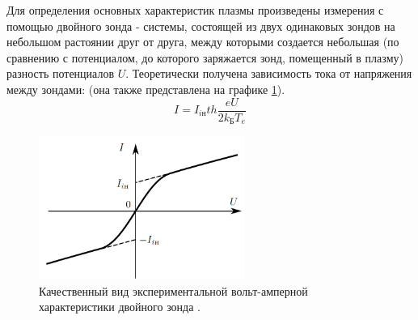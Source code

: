 \documentclass[a4paper,12pt]{article} %
\begin{document}
Для определения основных характеристик плазмы произведены измерения с помощью двойного зонда - системы, состоящей из двух одинаковых зондов на небольшом растоянии друг от друга, между которыми создается небольшая (по сравнению с потенциалом, до которого заряжается зонд, помещенный в плазму) разность потенциалов $U$. Теоретически получена зависимость тока от напряжения между зондами: (она также представлена на графике \ref{двойной}).\cite{labnik}
\begin{equation}
I = I_{iн} th\frac{eU}{2k_БT_e}
\end{equation}
\begin{figure}[h!]
\begin{center}
\includegraphics[width=0.6\textwidth]{Двойной}
\caption{Качественный вид экспериментальной вольт-амперной характеристики двойного зонда \cite{labnik}.} \label{двойной}
\end{center}
\end{figure}
\end{document}
